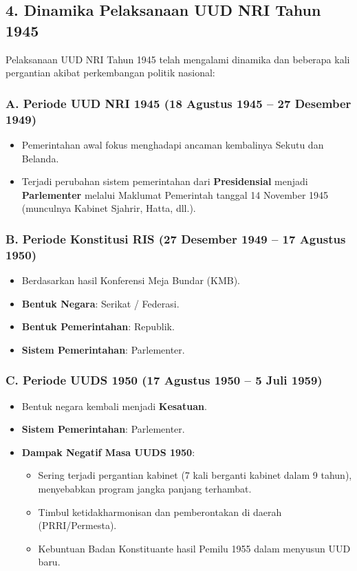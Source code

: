 \subsection{4. Dinamika Pelaksanaan UUD NRI Tahun 1945}
Pelaksanaan UUD NRI Tahun 1945 telah mengalami dinamika dan beberapa kali pergantian akibat perkembangan politik nasional:

\subsubsection{A. Periode UUD NRI 1945 (18 Agustus 1945 -- 27 Desember 1949)}
\begin{itemize}
    \item Pemerintahan awal fokus menghadapi ancaman kembalinya Sekutu dan Belanda.
    \item Terjadi perubahan sistem pemerintahan dari \textbf{Presidensial} menjadi \textbf{Parlementer} melalui Maklumat Pemerintah tanggal 14 November 1945 (munculnya Kabinet Sjahrir, Hatta, dll.).
\end{itemize}

\subsubsection{B. Periode Konstitusi RIS (27 Desember 1949 -- 17 Agustus 1950)}
\begin{itemize}
    \item Berdasarkan hasil Konferensi Meja Bundar (KMB).
    \item \textbf{Bentuk Negara}: Serikat / Federasi.
    \item \textbf{Bentuk Pemerintahan}: Republik.
    \item \textbf{Sistem Pemerintahan}: Parlementer.
\end{itemize}

\subsubsection{C. Periode UUDS 1950 (17 Agustus 1950 -- 5 Juli 1959)}
\begin{itemize}
    \item Bentuk negara kembali menjadi \textbf{Kesatuan}.
    \item \textbf{Sistem Pemerintahan}: Parlementer.
    \item \textbf{Dampak Negatif Masa UUDS 1950}:
    \begin{itemize}
        \item Sering terjadi pergantian kabinet (7 kali berganti kabinet dalam 9 tahun), menyebabkan program jangka panjang terhambat.
        \item Timbul ketidakharmonisan dan pemberontakan di daerah (PRRI/Permesta).
        \item Kebuntuan Badan Konstituante hasil Pemilu 1955 dalam menyusun UUD baru.
    \end{itemize}
\end{itemize}

